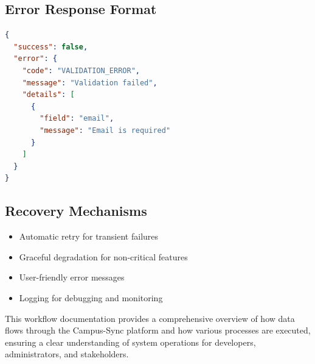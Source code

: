 \subsection{Error Response Format}

\begin{lstlisting}[language=JSON, caption=Error Response Format]
{
  "success": false,
  "error": {
    "code": "VALIDATION_ERROR",
    "message": "Validation failed",
    "details": [
      {
        "field": "email",
        "message": "Email is required"
      }
    ]
  }
}
\end{lstlisting}

\subsection{Recovery Mechanisms}

\begin{itemize}
    \item Automatic retry for transient failures
    \item Graceful degradation for non-critical features
    \item User-friendly error messages
    \item Logging for debugging and monitoring
\end{itemize}

This workflow documentation provides a comprehensive overview of how data flows through the Campus-Sync platform and how various processes are executed, ensuring a clear understanding of system operations for developers, administrators, and stakeholders.
